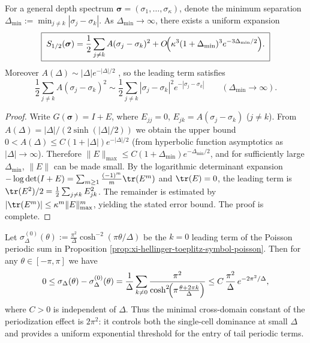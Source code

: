 \begin{proposition}\label{prop:xi-hellinger-cluster-expansion-large-separation}
For a general depth spectrum \(\boldsymbol{\sigma}=(\sigma_1,\dots,\sigma_\kappa)\), denote the minimum separation
\(
\Delta_{\min}:=\min_{j\neq k}|\sigma_j-\sigma_k|
\).
As \(\Delta_{\min}\to\infty\), there exists a uniform expansion
\[
\boxed{\;
S_{1/2}(\boldsymbol{\sigma})
=\frac12\sum_{j\neq k}A(\sigma_j-\sigma_k)^{2}
+O\!\Bigl(\kappa^{3}(1+\Delta_{\min})^{3}e^{-3\Delta_{\min}/2}\Bigr).\;}
\]
Moreover
\(
A(\Delta)\sim |\Delta|e^{-|\Delta|/2}
\)
, so the leading term satisfies
\[
\frac12\sum_{j\neq k}A(\sigma_j-\sigma_k)^2
\sim \frac12\sum_{j\neq k}|\sigma_j-\sigma_k|^2e^{-|\sigma_j-\sigma_k|}
\qquad(\Delta_{\min}\to\infty).
\]
\end{proposition}
\begin{proof}
Write \(G(\boldsymbol{\sigma})=I+E\), where \(E_{jj}=0\), \(E_{jk}=A(\sigma_j-\sigma_k)\) (\(j\neq k\)).
From \(A(\Delta)=|\Delta|/(2\sinh(|\Delta|/2))\) we obtain the upper bound
\(
0<A(\Delta)\le C(1+|\Delta|)e^{-|\Delta|/2}
\)
(from hyperbolic function asymptotics as \(|\Delta|\to\infty\)).
Therefore \(\|E\|_{\max}\le C(1+\Delta_{\min})e^{-\Delta_{\min}/2}\), and for sufficiently large \(\Delta_{\min}\), \(\|E\|\) can be made small.
By the logarithmic determinant expansion
\(
-\log\det(I+E)=\sum_{m\ge 1}\frac{(-1)^m}{m}\tr(E^m)
\)
and \(\tr(E)=0\), the leading term is \(\tr(E^2)/2=\frac12\sum_{j\neq k}E_{jk}^2\).
The remainder is estimated by \(|\tr(E^m)|\le \kappa^m\|E\|_{\max}^m\), yielding the stated error bound. The proof is complete.
\end{proof}

\begin{remark}\label{rem:xi-hellinger-toeplitz-periodization-constant-2pi2}
Let \(\sigma_\Delta^{(0)}(\theta):=\frac{\pi^2}{\Delta}\cosh^{-2}(\pi\theta/\Delta)\) be the \(k=0\) leading term of the Poisson periodic sum in Proposition \ref{prop:xi-hellinger-toeplitz-symbol-poisson}.
Then for any \(\theta\in[-\pi,\pi]\) we have
\[
0\le \sigma_\Delta(\theta)-\sigma_\Delta^{(0)}(\theta)
=\frac{1}{\Delta}\sum_{k\neq 0}\frac{\pi^{2}}{\cosh^{2}\!\Bigl(\pi\frac{\theta+2\pi k}{\Delta}\Bigr)}
\le C\,\frac{\pi^{2}}{\Delta}\,e^{-2\pi^{2}/\Delta},
\]
where \(C>0\) is independent of \(\Delta\).
Thus the minimal cross-domain constant of the periodization effect is \(2\pi^2\): it controls both the single-cell dominance at small \(\Delta\) and provides a uniform exponential threshold for the entry of tail periodic terms.
\end{remark}


